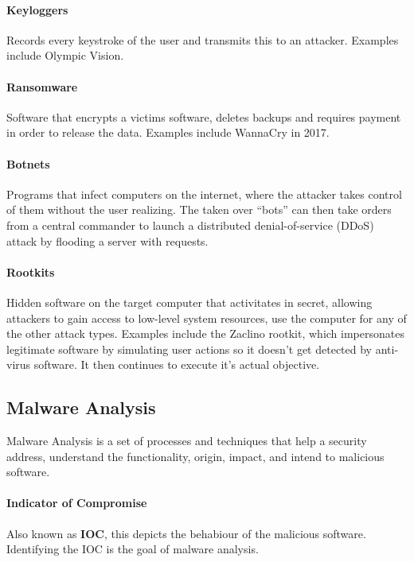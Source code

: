 \paragraph{Keyloggers} Records every keystroke of the user and transmits this to an attacker. Examples include Olympic Vision.

\paragraph{Ransomware} Software that encrypts a victims software, deletes backups and requires payment in order to release the data. Examples include WannaCry in 2017.

\paragraph{Botnets} Programs that infect computers on the internet, where the attacker takes control of them without the user realizing. The taken over ``bots'' can then take orders from a central commander to launch a distributed denial-of-service (DDoS) attack by flooding a server with requests.

\paragraph{Rootkits} Hidden software on the target computer that activitates in secret, allowing attackers to gain access to low-level system resources, use the computer for any of the other attack types. Examples include the Zaclino rootkit, which impersonates legitimate software by simulating user actions so it doesn't get detected by anti-virus software. It then continues to execute it's actual objective.

\subsection{Malware Analysis}

Malware Analysis is a set of processes and techniques that help a security address, understand the functionality, origin, impact, and intend to malicious software.

\paragraph{Indicator of Compromise} Also known as \textbf{IOC}, this depicts the behabiour of the malicious software. Identifying the IOC is the goal of malware analysis.

